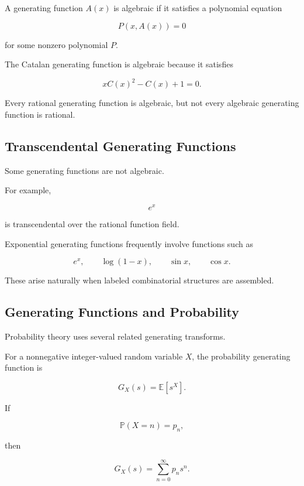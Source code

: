 A generating function \(A(x)\) is algebraic if it satisfies a
polynomial equation

\[
\boxed{
P(x,A(x))=0
}
\]

for some nonzero polynomial \(P\).

The Catalan generating function is algebraic because it satisfies

\[
xC(x)^2-C(x)+1=0.
\]

Every rational generating function is algebraic, but not every
algebraic generating function is rational.

\subsection{Transcendental Generating Functions}
\label{subsec:transcendental-generating-functions}

Some generating functions are not algebraic.

For example,

\[
e^x
\]

is transcendental over the rational function field.

Exponential generating functions frequently involve functions such as

\[
e^x,
\qquad
\log(1-x),
\qquad
\sin x,
\qquad
\cos x.
\]

These arise naturally when labeled combinatorial structures are
assembled.

\subsection{Generating Functions and Probability}
\label{subsec:generating-functions-probability-preview}

Probability theory uses several related generating transforms.

For a nonnegative integer-valued random variable \(X\), the probability
generating function is

\[
\boxed{
G_X(s)
=
\mathbb{E}[s^X].
}
\]

If

\[
\mathbb{P}(X=n)=p_n,
\]

then

\[
G_X(s)
=
\sum_{n=0}^{\infty}p_ns^n.
\]

